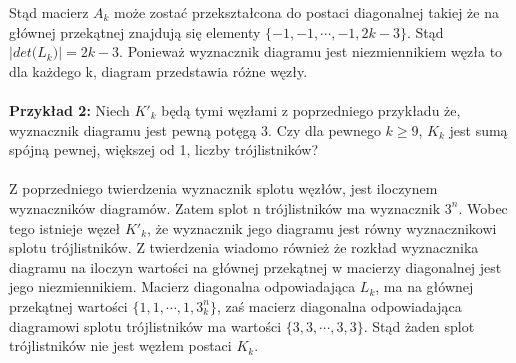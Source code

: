 Stąd macierz $A_{k} $ może zostać przekształcona do postaci diagonalnej takiej że na głównej przekątnej znajdują się elementy $\lbrace -1, -1, \cdots, -1, 2k-3 \rbrace$. Stąd $\vert det \big( L_{k} \big) \vert = 2k - 3$. Ponieważ wyznacznik diagramu jest niezmiennikiem węzła to dla każdego k, diagram przedstawia różne węzły. \\ \\

 \textbf{Przykład 2:}
 Niech $K'_{k}$ będą tymi węzłami z poprzedniego przykładu że, wyznacznik diagramu jest pewną potęgą 3. Czy dla pewnego $k\geq9$, $K_{k}$  jest sumą spójną pewnej, większej od 1, liczby trójlistników? \\ \\
 Z poprzedniego twierdzenia wyznacznik splotu węzłów, jest iloczynem wyznaczników diagramów. Zatem splot n trójlistników ma wyznacznik $3^n$. Wobec tego istnieje węzeł $K'_{k}$, że wyznacznik jego diagramu jest równy wyznacznikowi splotu trójlistników. Z twierdzenia wiadomo również że rozkład wyznacznika diagramu na iloczyn wartości na głównej przekątnej w macierzy diagonalnej jest jego niezmiennikiem. Macierz diagonalna odpowiadająca $L_{k}$, ma na głównej przekątnej wartości $\lbrace 1, 1, \cdots, 1, 3^n_{k} \rbrace$, zaś macierz diagonalna odpowiadająca diagramowi splotu trójlistników ma wartości $\lbrace 3, 3, \cdots, 3, 3 \rbrace$. Stąd żaden splot trójlistników nie jest węzłem postaci $K_{k}$.
 

 